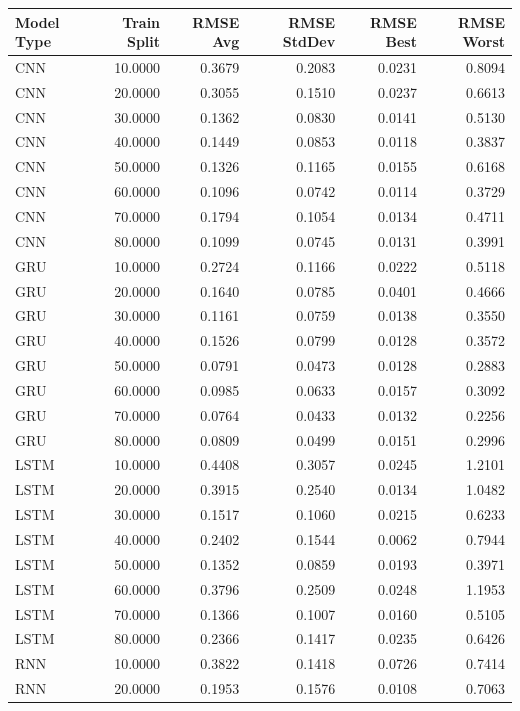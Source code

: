 \begin{tabular}{lrrrrr}
\toprule
Model Type & Train Split & RMSE Avg & RMSE StdDev & RMSE Best & RMSE Worst \\
\midrule
CNN & 10.0000 & 0.3679 & 0.2083 & 0.0231 & 0.8094 \\
CNN & 20.0000 & 0.3055 & 0.1510 & 0.0237 & 0.6613 \\
CNN & 30.0000 & 0.1362 & 0.0830 & 0.0141 & 0.5130 \\
CNN & 40.0000 & 0.1449 & 0.0853 & 0.0118 & 0.3837 \\
CNN & 50.0000 & 0.1326 & 0.1165 & 0.0155 & 0.6168 \\
CNN & 60.0000 & 0.1096 & 0.0742 & 0.0114 & 0.3729 \\
CNN & 70.0000 & 0.1794 & 0.1054 & 0.0134 & 0.4711 \\
CNN & 80.0000 & 0.1099 & 0.0745 & 0.0131 & 0.3991 \\
GRU & 10.0000 & 0.2724 & 0.1166 & 0.0222 & 0.5118 \\
GRU & 20.0000 & 0.1640 & 0.0785 & 0.0401 & 0.4666 \\
GRU & 30.0000 & 0.1161 & 0.0759 & 0.0138 & 0.3550 \\
GRU & 40.0000 & 0.1526 & 0.0799 & 0.0128 & 0.3572 \\
GRU & 50.0000 & 0.0791 & 0.0473 & 0.0128 & 0.2883 \\
GRU & 60.0000 & 0.0985 & 0.0633 & 0.0157 & 0.3092 \\
GRU & 70.0000 & 0.0764 & 0.0433 & 0.0132 & 0.2256 \\
GRU & 80.0000 & 0.0809 & 0.0499 & 0.0151 & 0.2996 \\
LSTM & 10.0000 & 0.4408 & 0.3057 & 0.0245 & 1.2101 \\
LSTM & 20.0000 & 0.3915 & 0.2540 & 0.0134 & 1.0482 \\
LSTM & 30.0000 & 0.1517 & 0.1060 & 0.0215 & 0.6233 \\
LSTM & 40.0000 & 0.2402 & 0.1544 & 0.0062 & 0.7944 \\
LSTM & 50.0000 & 0.1352 & 0.0859 & 0.0193 & 0.3971 \\
LSTM & 60.0000 & 0.3796 & 0.2509 & 0.0248 & 1.1953 \\
LSTM & 70.0000 & 0.1366 & 0.1007 & 0.0160 & 0.5105 \\
LSTM & 80.0000 & 0.2366 & 0.1417 & 0.0235 & 0.6426 \\
RNN & 10.0000 & 0.3822 & 0.1418 & 0.0726 & 0.7414 \\
RNN & 20.0000 & 0.1953 & 0.1576 & 0.0108 & 0.7063 \\

\end{tabular}
